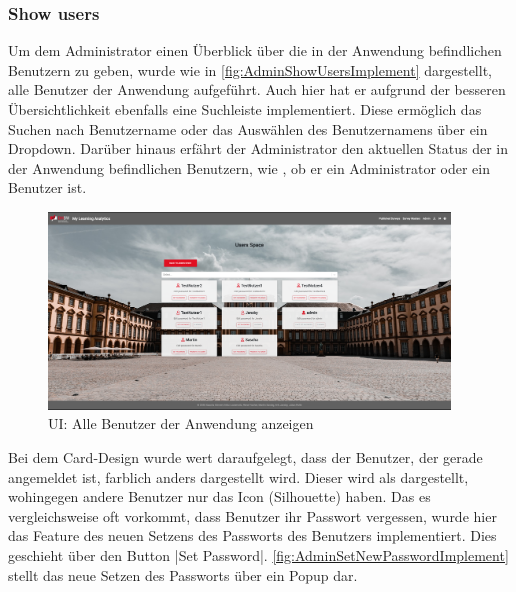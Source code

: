 \subsubsection*{Show users \faUsers}

Um dem Administrator einen Überblick über die in der Anwendung befindlichen Benutzern zu geben, wurde wie in \abb \vref{fig:AdminShowUsersImplement} dargestellt, alle Benutzer der Anwendung aufgeführt.
Auch hier hat er aufgrund der besseren Übersichtlichkeit ebenfalls eine Suchleiste implementiert. 
Diese ermöglich das Suchen nach Benutzername oder das Auswählen des Benutzernamens über ein Dropdown. 
Darüber hinaus erfährt der Administrator den aktuellen Status der in der Anwendung befindlichen Benutzern, wie \zb, ob er ein Administrator oder ein Benutzer ist.

\begin{figure}[hp]
	\centering
	\includegraphics[width=0.95\textwidth, keepaspectratio]{img/client/AdminShowUsers.png}
	\captionsetup{justification=centering, format=plain}
	\caption[\acf{UI}: Alle Benutzer der Anwendung anzeigen]{\acf{UI}: Alle Benutzer der Anwendung anzeigen \\ \quelleScreenshot}
	\label{fig:AdminShowUsersImplement}
\end{figure}

Bei dem Card-Design wurde wert daraufgelegt, dass der Benutzer, der gerade angemeldet ist, farblich anders dargestellt wird. 
Dieser wird als \faUser\xspace dargestellt, wohingegen andere Benutzer nur das Icon \faUser[regular]\xspace (Silhouette) haben. \newline
Das es vergleichsweise oft vorkommt, dass Benutzer ihr Passwort vergessen, wurde hier das Feature des neuen Setzens des Passworts des Benutzers implementiert. 
Dies geschieht über den Button \jinline|Set Password|. \abb \vref{fig:AdminSetNewPasswordImplement} stellt das neue Setzen des Passworts über ein Popup dar.

